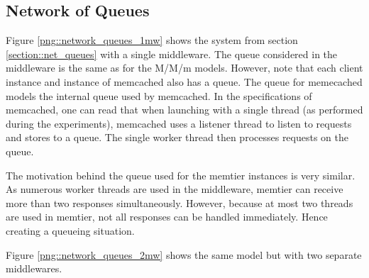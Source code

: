 \documentclass[11pt,a4paper]{article}
\begin{document}
\subsection{Network of Queues}
Figure \ref{png::network_queues_1mw} shows the system from section \ref{section::net_queues} with a single middleware. The queue considered in the middleware is the same as for the M/M/m models. However, note that each client instance and instance of memcached also has a queue. The queue for memecached models the internal queue used by memcached. In the specifications of memcached, one can read that when launching with a single thread (as performed during the experiments), memcached uses a listener thread to listen to requests and stores to a queue. The single worker thread then processes requests on the queue.

The motivation behind the queue used for the memtier instances is very similar. As numerous worker threads are used in the middleware, memtier can receive more than two responses simultaneously. However, because at most two threads are used in memtier, not all responses can be handled immediately. Hence creating a queueing situation.

Figure \ref{png::network_queues_2mw} shows the same model but with two separate middlewares.
\end{document}
